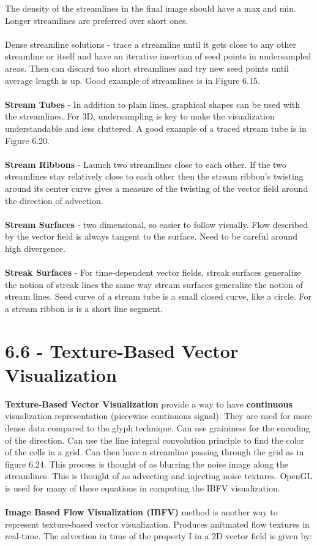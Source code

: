 \documentclass{article}
\begin{document}
The density of the streamlines in the final image should have a max and min. Longer streamlines are preferred over short ones.
\\\\
Dense streamline solutions - trace a streamline until it gets close to any other streamline or itself and have an iterative insertion of seed points in undersampled areas. Then can discard too short streamlines and try new seed points until average length is up. Good example of streamlines is in Figure 6.15.
\\\\
\textbf{Stream Tubes} - In addition to plain lines, graphical shapes can be used with the streamlines. For 3D, undersampling is key to make the visualization understandable and less cluttered. A good example of a traced stream tube is in Figure 6.20.
\\\\
\textbf{Stream Ribbons} - Launch two streamlines close to each other. If the two streamlines stay relatively close to each other then the stream ribbon's twisting around its center curve gives a measure of the twisting of the vector field around the direction of advection. %
\\\\
\textbf{Stream Surfaces} - two dimensional, so easier to follow visually. Flow described by the vector field is always tangent to the surface. Need to be careful around high divergence. 
\\\\
\textbf{Streak Surfaces} - For time-dependent vector fields, streak surfaces generalize the notion of streak lines the same way stream surfaces generalize the notion of stream lines. Seed curve of a stream tube is a small closed curve, like a circle. For a stream ribbon is is a short line segment. 

\section*{6.6 - Texture-Based Vector Visualization}
\textbf{ Texture-Based Vector Visualization} provide a way to have \textbf{continuous} visualization representation (piecewise continuous signal). They are used for more dense data compared to the glyph technique. Can use graininess for the encoding of the direction. Can use the line integral convolution principle to find the color of the cells in a grid. Can then have a streamline passing through the grid as in figure 6.24. This process is thought of as blurring the noise image along the streamlines. This is thought of as advecting and injecting noise textures. OpenGL is used for many of these equations in computing the IBFV visualization.
\\\\
\textbf{Image Based Flow Visualization (IBFV)} method is another way to represent texture-based vector visualization. Produces anitmated flow textures in real-time. The advection in time of the property I in a 2D vector field is given by:
\end{document}
